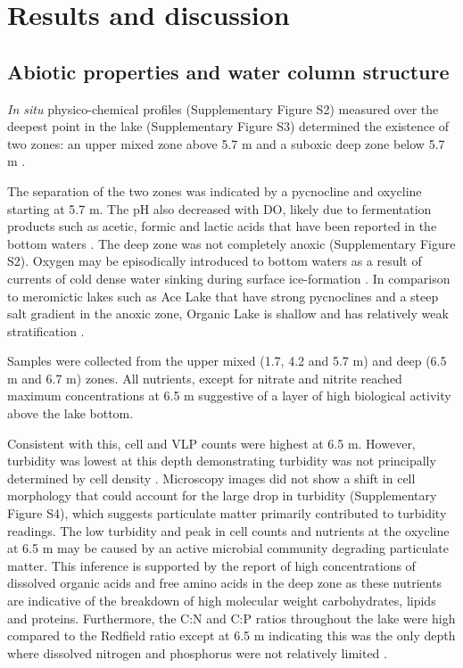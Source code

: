 

\section{Results and discussion}

\subsection{Abiotic properties and water column structure}
\emph{In situ} physico-chemical profiles (Supplementary Figure S2) measured over the deepest point in the lake (Supplementary Figure S3) determined the existence of two zones: an upper mixed zone above 5.7 m and a suboxic deep zone below 5.7 m .
 
The separation of the two zones was indicated by a pycnocline and oxycline starting at 5.7 m. 
The pH also decreased with \ac{DO}, likely due to fermentation products such as acetic, formic and lactic acids that have been reported in the bottom waters \cite{Franzmann1987b, Gibson1994}. 
The deep zone was not completely anoxic (Supplementary Figure S2). 
Oxygen may be episodically introduced to bottom waters as a result of currents of cold dense water sinking during surface ice-formation \cite{Ferris1991}. 
In comparison to meromictic lakes such as Ace Lake that have strong pycnoclines and a steep salt gradient in the anoxic zone, Organic Lake is shallow and has relatively weak stratification \cite{Gibson1999}. 

Samples were collected from the upper mixed (1.7, 4.2 and 5.7 m) and deep (6.5 m and 6.7 m) zones. 
All nutrients, except for nitrate and nitrite reached maximum concentrations at 6.5 m  suggestive of a layer of high biological activity above the lake bottom. 

Consistent with this, cell and \ac{VLP} counts were highest at 6.5 m. 
However, turbidity was lowest at this depth demonstrating turbidity was not principally determined by cell density . 
Microscopy images did not show a shift in cell morphology that could account for the large drop in turbidity (Supplementary Figure S4), which suggests particulate matter primarily contributed to turbidity readings. 
The low turbidity and peak in cell counts and nutrients at the oxycline at 6.5 m may be caused by an active microbial community degrading particulate matter. 
This inference is supported by the report of high concentrations of dissolved organic acids and free amino acids in the deep zone \cite{Gibson1994} as these nutrients are indicative of the breakdown of high molecular weight carbohydrates, lipids and proteins. 
Furthermore, the C:N and C:P ratios throughout the lake were high compared to the Redfield ratio \cite{Redfield1963} except at 6.5 m indicating this was the only depth where dissolved nitrogen and phosphorus were not relatively limited .
 
